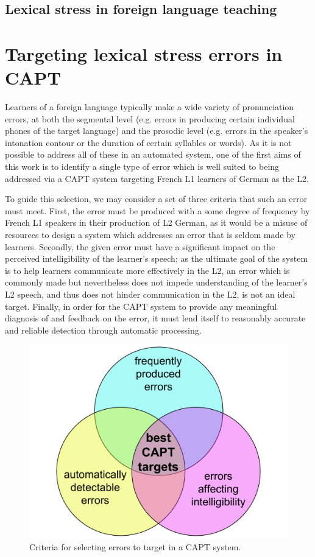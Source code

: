 		\subsection{Lexical stress in foreign language teaching}
		\label{sec:stress:l2ed}
		
		
 \section{Targeting lexical stress errors in CAPT}
 \label{sec:bkgd:targeting}
 	Learners of a foreign language typically make a wide variety of pronunciation errors, at both the segmental level (e.g. errors in producing certain individual phones of the target language) and the prosodic level (e.g. errors in the speaker's intonation contour or the duration of certain syllables or words). As it is not possible to address all of these in an automated system, one of the first aims of this work is to identify a single type of error which is well suited to being addressed via a CAPT system targeting French L1 learners of German as the L2. 
	
	To guide this selection, we may consider %
a set of three criteria that such an error must meet. First, the error must be produced with a some degree of frequency by French L1 speakers in their production of L2 German, as it would be a misuse of resources to design a system which addresses an error that is seldom made by learners. Secondly, the given error must have a significant impact on the perceived intelligibility of the learner's speech; as the ultimate goal of the system is to help learners communicate more effectively in the L2, an error which is commonly made but nevertheless does not impede understanding of the learner's L2 speech, and thus does not hinder communication in the L2, is not an ideal target. Finally, in order for the CAPT system to provide any meaningful diagnosis of and feedback on the error, it must lend itself to reasonably accurate and reliable  detection through automatic processing. 
	
		\begin{figure}[htb]
			\centering
			\includegraphics[width=.7\textwidth]{../img/error-venn}
			\caption{Criteria for selecting errors to target in a CAPT system.}
			\label{fig:errors}
		\end{figure}
	

